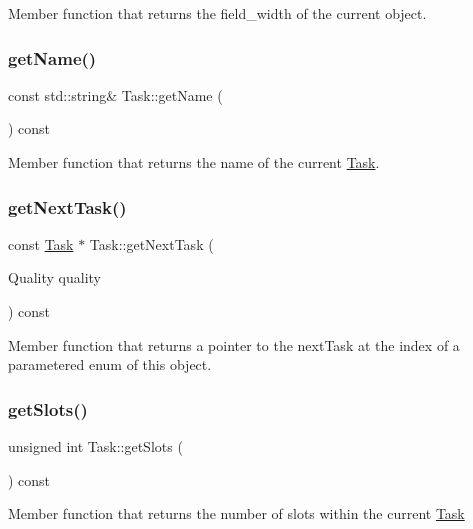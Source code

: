 Member function that returns the field\+\_\+width of the current object. \mbox{\label{classTask_af12eb32f3bc744e6fa0480ca99c11f2c}} 
\subsubsection{\texorpdfstring{get\+Name()}{getName()}}
{\footnotesize\ttfamily const std\+::string\& Task\+::get\+Name (\begin{DoxyParamCaption}{ }\end{DoxyParamCaption}) const\hspace{0.3cm}{\ttfamily [inline]}}

Member function that returns the name of the current \mbox{\hyperlink{classTask}{Task}}. \mbox{\label{classTask_acf6851078d506896872fa7cc6476e5bf}} 
\subsubsection{\texorpdfstring{get\+Next\+Task()}{getNextTask()}}
{\footnotesize\ttfamily const \mbox{\hyperlink{classTask}{Task}} $\ast$ Task\+::get\+Next\+Task (\begin{DoxyParamCaption}\item[{Quality}]{quality }\end{DoxyParamCaption}) const}

Member function that returns a pointer to the next\+Task at the index of a parametered enum of this object. \mbox{\label{classTask_a67589413dbb0d5ffa3b2f08c6fa461ea}} 
\subsubsection{\texorpdfstring{get\+Slots()}{getSlots()}}
{\footnotesize\ttfamily unsigned int Task\+::get\+Slots (\begin{DoxyParamCaption}{ }\end{DoxyParamCaption}) const\hspace{0.3cm}{\ttfamily [inline]}}

Member function that returns the number of slots within the current \mbox{\hyperlink{classTask}{Task}} \mbox{\label{classTask_a974eb3143ac070fd67495f3c4a108a96}} 
